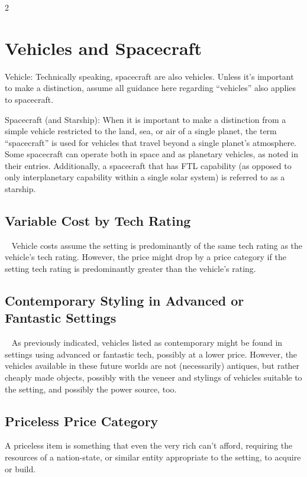 \begin{multicols}{2}

\chapter{Vehicles and Spacecraft}

Vehicle: Technically speaking, spacecraft are also vehicles. Unless it’s important to make a distinction, assume all guidance here regarding “vehicles” also applies to spacecraft. 

Spacecraft (and Starship): When it is important to make a distinction from a simple vehicle restricted to the land, sea, or air of a single planet, the term “spacecraft” is used for vehicles that travel beyond a single planet’s atmosphere. Some spacecraft can operate both in space and as planetary vehicles, as noted in their entries. Additionally, a spacecraft that has FTL capability (as opposed to only interplanetary capability within a single solar system) is referred to as a starship.

\section{Variable Cost by Tech Rating}
 
Vehicle costs assume the setting is predominantly of the same tech rating as the vehicle’s tech rating. However, the price might drop by a price category if the setting tech rating is predominantly greater than the vehicle’s rating. 

\section{Contemporary Styling in Advanced or Fantastic Settings}
 
As previously indicated, vehicles listed as contemporary might be found in settings using advanced or fantastic tech, possibly at a lower price. However, the vehicles available in these future worlds are not (necessarily) antiques, but rather cheaply made objects, possibly with the veneer and stylings of vehicles suitable to the setting, and possibly the power source, too.

\section{Priceless Price Category}

A priceless item is something that even the very rich can’t afford, requiring the resources of a nation-state, or similar entity appropriate to the setting, to acquire or build.


\end{multicols}

